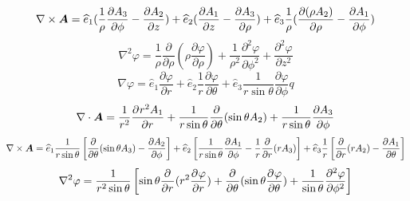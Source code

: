 \documentclass[UTF8,9pt]{ctexart}
\begin{document}
$$ { \nabla \times \bm{ A } } =\hat e_1 (\ff{\rho} \frac { \partial A_3} { \partial \phi } - \frac { \partial A _ { 2 } } { \partial z } ) + \hat { e } _ { 2 } ( \frac { \partial A _ { 1 } } { \partial z } - \frac { \partial A _ { 3 } } { \partial \rho } ) + \hat { e } _ { 3 } \frac { 1 } { \rho } ( \frac { \partial ( \rho A _ { 2 } ) } { \partial \rho } - \frac { \partial A _ { 1 } } { \partial \phi } )$$
$$\nabla ^ { 2 } \varphi = \frac { 1 } { \rho } \frac { \partial } { \partial \rho } ( \rho \frac { \partial \varphi } { \partial \rho } ) + \frac { 1 } { \rho ^ { 2 } } \frac { \partial ^ { 2 } \varphi } { \partial \phi ^ { 2 } } + \frac { \partial ^ { 2 } \varphi } { \partial z ^ { 2 } }$$
$$\nabla \varphi = \hat { e } _ { 1 } \frac { \partial \varphi } { \partial r } + \hat { e } _ { 2 } \frac { 1 } { r } \frac { \partial \varphi } { \partial \theta } + \hat { e } _ { 3 } \frac { 1 } { r \sin \theta } \frac { \partial \varphi } { \partial \phi }q$$
$$\nabla \cdot \bm{ A } = \ff{r^2} \pp{r^2A_1}{r} + \frac { 1 } { r \sin \theta } \frac { \partial } { \partial \theta } ( \sin \theta A _ { 2 } ) + \frac { 1 } { r \sin \theta } \frac { \partial A _ { 3 } } { \partial \phi }$$
$\dis\nabla \times \bm{ A }  = 
\hat { e } _ { 1 } \frac { 1 } { r \sin \theta } \left[ \frac { \partial } { \partial \theta } ( \sin \theta A _ { 3 } ) - \frac { \partial A _ { 2 } } { \partial \phi } \right]  
+ \hat { e } _ { 2 } \left[ \frac { 1 } { r \sin \theta } \frac { \partial A _ { 1 } } { \partial \phi } - \frac { 1 } { r } \frac { \partial } { \partial r } ( r A _ { 3 } ) \right] 
+ \hat { e } _ { 3 } \frac { 1 } { r } \left[ \frac { \partial } { \partial r } ( r A _ { 2 } ) - \frac { \partial A _ { 1 } } { \partial \theta } \right] $
$$\nabla^2\varphi=\ff{r^2\sin\t}\left[\sin\t\pp{}{r}(r^2\pp{\varphi}{r})+\pp{}{\t}(\sin\t\pp{\varphi}{\t})+\ff{\sin\t}\pp[2]{\varphi}{\phi}\right]$$
\end{document}
